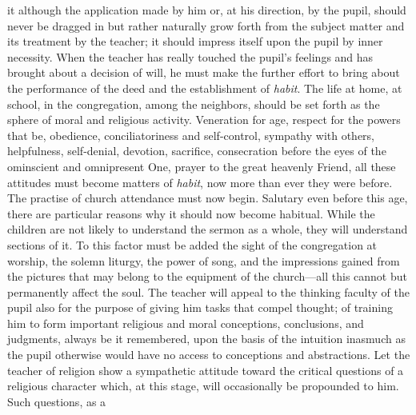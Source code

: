it although the application made by him or, at his direction, by the pupil, should never be dragged in but rather naturally grow forth from the subject matter and its treatment by the teacher; it should impress itself upon the pupil by inner necessity. When the teacher has really touched the pupil’s feelings and has brought about a decision of will, he must make the further effort to bring about the performance of the deed and the establishment of \emph{habit}. The life at home, at school, in the congregation, among the neighbors, should be set forth as the sphere of moral and religious activity. Veneration for age, respect for the powers that be, obedience, conciliatoriness and self-control, sympathy with others, helpfulness, self-denial, devotion, sacrifice, consecration before the eyes of the ominscient and omnipresent One, prayer to the great heavenly Friend, all these attitudes must become matters of \emph{habit}, now more than ever they were before. The practise of church attendance must now begin. Salutary even before this age, there are particular reasons why it should now become habitual. While the children are not likely to understand the sermon as a whole, they will understand sections of it. To this factor must be added the sight of the congregation at worship, the solemn liturgy, the power of song, and the impressions gained from the pictures that may belong to the equipment of the church—all this cannot but permanently affect the soul. The teacher will appeal to the thinking faculty of the pupil also for the purpose of giving him tasks that compel thought; of training him to form important religious and moral conceptions, conclusions, and judgments, always be it remembered, upon the basis of the intuition inasmuch as the pupil otherwise would have no access to conceptions and abstractions. Let the teacher of religion show a sympathetic attitude toward the critical questions of a religious character which, at this stage, will occasionally be propounded to him. Such questions, as a
